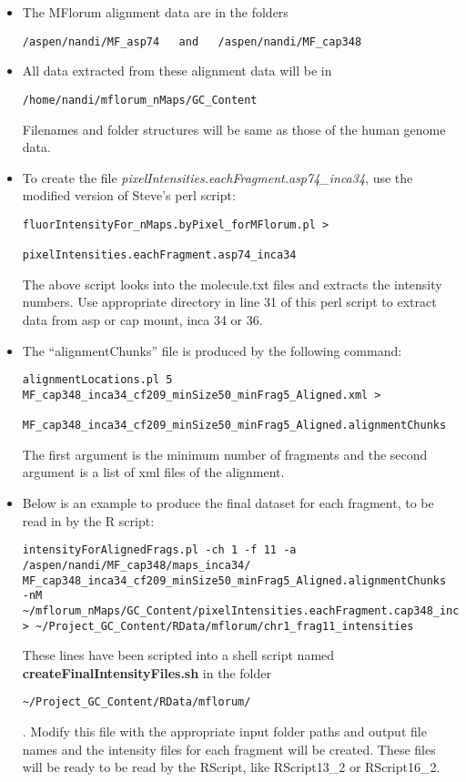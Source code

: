 \documentclass[11pt]{article}
\begin{document}
\begin{enumerate}
\begin{itemize}
\item
The MFlorum alignment data are in the folders
\begin{verbatim}
/aspen/nandi/MF_asp74   and   /aspen/nandi/MF_cap348
\end{verbatim}
\item
All data extracted from these alignment data will be in 
\begin{verbatim}
/home/nandi/mflorum_nMaps/GC_Content
\end{verbatim}
Filenames and folder structures will be same as those of the human genome data. 
\item
To create the file {\it{pixelIntensities.eachFragment.asp74\_inca34}}, use the modified version of Steve's perl script: 
\begin{verbatim}
fluorIntensityFor_nMaps.byPixel_forMFlorum.pl > 
                             pixelIntensities.eachFragment.asp74_inca34
\end{verbatim}
The above script looks into the molecule.txt files and extracts the intensity numbers.
Use appropriate directory in line 31 of this perl script to extract data from asp or cap mount, inca 34 or 36.
\item
The ``alignmentChunks'' file is produced by the following command:
\begin{verbatim}
alignmentLocations.pl 5 MF_cap348_inca34_cf209_minSize50_minFrag5_Aligned.xml > 
		MF_cap348_inca34_cf209_minSize50_minFrag5_Aligned.alignmentChunks
\end{verbatim}
The first argument is the minimum number of fragments and the second argument is a list of xml files of the alignment. 
\item
Below is an example to produce the final dataset for each fragment, to be read in by the R script:
\begin{verbatim}
intensityForAlignedFrags.pl -ch 1 -f 11 -a 
/aspen/nandi/MF_cap348/maps_inca34/
MF_cap348_inca34_cf209_minSize50_minFrag5_Aligned.alignmentChunks 
-nM ~/mflorum_nMaps/GC_Content/pixelIntensities.eachFragment.cap348_inca34 
> ~/Project_GC_Content/RData/mflorum/chr1_frag11_intensities
\end{verbatim}
These lines have been scripted into a shell script named {\bf{createFinalIntensityFiles.sh}} in the folder 
\begin{verbatim} 
~/Project_GC_Content/RData/mflorum/ 
\end{verbatim}. 
Modify this file with the appropriate input folder paths and output file names and the intensity files for each fragment will be created. These files will be ready to be read by the RScript, like RScript13\_2 or RScript16\_2. 
\end{itemize}


\end{enumerate}
\end{document}
